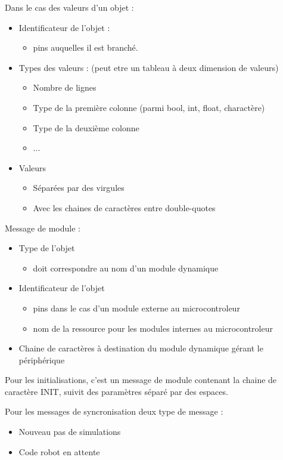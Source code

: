 Dans le cas des valeurs d'un objet :
\begin{itemize}
    \item{Identificateur de l'objet :}
    \begin{itemize}
        \item{pins auquelles il est branché.}
    \end{itemize}
    \item{Types des valeurs : (peut etre un tableau à deux dimension de valeurs)}
    \begin{itemize}
        \item{Nombre de lignes}
        \item{Type de la première colonne (parmi bool, int, float, charactère)}
        \item{Type de la deuxième colonne}
        \item{...}
    \end{itemize}
    \item{Valeurs}
    \begin{itemize}
        \item{Séparées par des virgules}
        \item{Avec les chaines de caractères entre double-quotes}
    \end{itemize}
\end{itemize}

Message de module :
\begin{itemize}
    \item{Type de l'objet}
    \begin{itemize}
        \item{doit correspondre au nom d'un module dynamique}
    \end{itemize}
    \item{Identificateur de l'objet}
    \begin{itemize}
        \item{pins dans le cas d'un module externe au microcontroleur}
        \item{nom de la ressource pour les modules internes au microcontroleur}
    \end{itemize}
    \item{Chaine de caractères à destination du module dynamique gérant le périphérique}
\end{itemize}

Pour les initialisations, c'est un message de module contenant la chaine de caractère INIT, suivit des paramètres séparé par des espaces.

Pour les messages de syncronisation deux type de message :
\begin{itemize}
    \item{Nouveau pas de simulations}
    \item{Code robot en attente}
\end{itemize}
